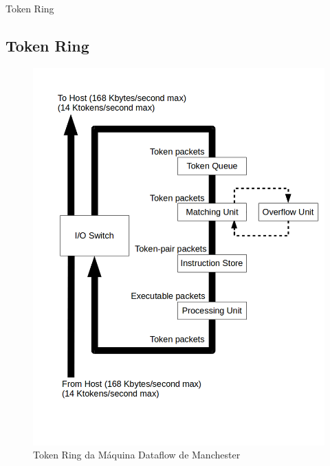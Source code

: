 \documentclass{beamer}
\begin{document}
\begin{frame}{Token Ring}
	\subsection{Token Ring}
	\begin{figure}
		\centering
		\caption{Token Ring da Máquina Dataflow de Manchester}
		\label{fig:tokenRing}
		\includegraphics[height=.87\textheight]{figura}
	\end{figure}
\end{frame}
\end{document}
